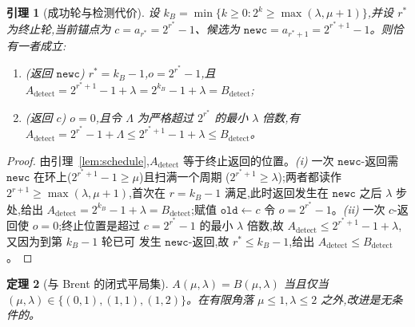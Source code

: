 \documentclass[11pt]{ctexart}
\newtheorem{theorem}{定理}[section]
\newtheorem{lemma}[theorem]{引理}
\newcommand{\oldc}{\texttt{old}}
\newcommand{\newc}{\texttt{newc}}
\begin{document}
\begin{lemma}[成功轮与检测代价]
\label{lem:success-round}
设 $k_B=\min\{k\ge 0:2^{k}\ge\max(\lambda,\mu+1)\}$,并设 $r^{\ast}$ 为终止轮,当前锚点为
$c=a_{r^{\ast}}=2^{r^{\ast}}-1$、候选为 $\newc=a_{r^{\ast}+1}=2^{r^{\ast}+1}-1$。则恰有一者成立:
\begin{enumerate}[leftmargin=2.2em,label=\textup{(\roman*)}]
  \item \textup{(返回 $\newc$)} $r^{\ast}=k_B-1$,$o=2^{r^{\ast}}-1$,且
        $A_{\mathrm{detect}}=2^{r^{\ast}+1}-1+\lambda=2^{k_B}-1+\lambda=B_{\mathrm{detect}}$;
  \item \textup{(返回 $c$)} $o=0$,且令 $\Lambda$ 为严格超过 $2^{r^{\ast}}$ 的最小 $\lambda$
        倍数,有
        $A_{\mathrm{detect}}=2^{r^{\ast}}-1+\Lambda\le 2^{r^{\ast}+1}-1+\lambda\le B_{\mathrm{detect}}$。
\end{enumerate}
\end{lemma}

\begin{proof}
由引理~\ref{lem:schedule},$A_{\mathrm{detect}}$ 等于终止返回的位置。\emph{(i)} 一次
$\newc$-返回需 $\newc$ 在环上($2^{r^{\ast}+1}-1\ge\mu$)且扫满一个周期
($2^{r^{\ast}+1}\ge\lambda$);两者都读作 $2^{r+1}\ge\max(\lambda,\mu+1)$,首次在 $r=k_B-1$
满足,此时返回发生在 $\newc$ 之后 $\lambda$ 步处,给出
$A_{\mathrm{detect}}=2^{k_B}-1+\lambda=B_{\mathrm{detect}}$;赋值 $\oldc\gets c$ 令
$o=2^{r^{\ast}}-1$。\emph{(ii)} 一次 $c$-返回使 $o=0$;终止位置是超过 $c=2^{r^{\ast}}-1$ 的最小
$\lambda$ 倍数,故 $A_{\mathrm{detect}}\le 2^{r^{\ast}+1}-1+\lambda$,又因为到第 $k_B-1$ 轮已可
发生 $\newc$-返回,故 $r^{\ast}\le k_B-1$,给出 $A_{\mathrm{detect}}\le B_{\mathrm{detect}}$。
\end{proof}

\begin{theorem}[与 Brent 的闭式平局集]
\label{thm:brent-ties-closed}
$A(\mu,\lambda)=B(\mu,\lambda)$ \emph{当且仅当}
$(\mu,\lambda)\in\{(0,1),(1,1),(1,2)\}$。在有限角落 $\mu\le1,\lambda\le2$ 之外,改进是无条件的。
\end{theorem}
\end{document}
